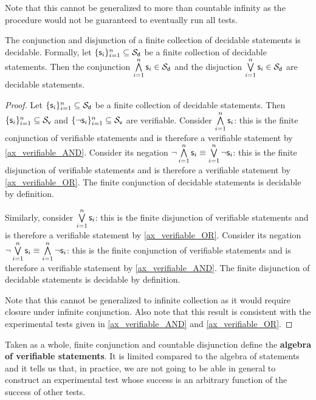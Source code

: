 \documentclass[11pt,letterpaper,fleqn]{memoir} %
\begin{document}
\begin{mathSection}
\begin{justification}
		Note that this cannot be generalized to more than countable infinity as the procedure would not be guaranteed to eventually run all tests.
	\end{justification}
	\begin{prop}\label{prop_decidable_AND_OR}
		The conjunction and disjunction of a finite collection of decidable statements is decidable. Formally, let $\{\mathsf{s}_i\}_{i=1}^{n} \subseteq \mathcal{S}_\textsf{d}$ be a finite collection of decidable statements. Then the conjunction $\bigwedge\limits_{i=1}^{n} \mathsf{s}_i \in \mathcal{S}_\textsf{d}$ and the disjuction $\bigvee\limits_{i=1}^{n} \mathsf{s}_i \in \mathcal{S}_\textsf{d}$ are decidable statements.
	\end{prop}
\begin{proof}
	Let $\{\mathsf{s}_i\}_{i=1}^{n} \subseteq \mathcal{S}_\textsf{d}$ be a finite collection of decidable statements. Then $\{\mathsf{s}_i\}_{i=1}^{n} \subseteq \mathcal{S}_\textsf{v}$ and $\{\neg\mathsf{s}_i\}_{i=1}^{n} \subseteq \mathcal{S}_\textsf{v}$ are verifiable. Consider $\bigwedge\limits_{i=1}^{n} \mathsf{s}_i$: this is the finite conjunction of verifiable statements and is therefore a verifiable statement by \ref{ax_verifiable_AND}. Consider its negation $\neg \bigwedge\limits_{i=1}^{n} \mathsf{s}_i \equiv \bigvee\limits_{i=1}^{n} \neg \mathsf{s}_i$: this is the finite disjunction of verifiable statements and is therefore a verifiable statement by \ref{ax_verifiable_OR}. The finite conjunction of decidable statements is decidable by definition.
	
	Similarly, consider $\bigvee\limits_{i=1}^{n} \mathsf{s}_i$: this is the finite disjunction of verifiable statements and is therefore a verifiable statement by \ref{ax_verifiable_OR}. Consider its negation $\neg \bigvee\limits_{i=1}^{n} \mathsf{s}_i \equiv \bigwedge\limits_{i=1}^{n} \neg \mathsf{s}_i$: this is the finite conjunction of verifiable statements and is therefore a verifiable statement by \ref{ax_verifiable_AND}. The finite disjunction of decidable statements is decidable by definition.
	
	Note that this cannot be generalized to infinite collection as it would require closure under infinite conjunction. Also note that this result is consistent with the experimental tests given in \ref{ax_verifiable_AND} and \ref{ax_verifiable_OR}.
\end{proof}
\end{mathSection}

Taken as a whole, finite conjunction and countable disjunction define the \textbf{algebra of verifiable statements}. It is limited compared to the algebra of statements and it tells us that, in practice, we are not going to be able in general to construct an experimental test whose success is an arbitrary function of the success of other tests.
\end{document}
